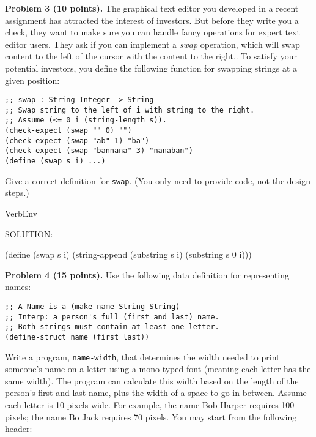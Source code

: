\documentclass[12pt]{article}
\begin{document}

\newpage

\noindent
{\bf Problem 3 (10 points).}
%
The graphical text editor you developed in a recent assignment has
attracted the interest of investors.  But before they write you a
check, they want to make sure you can handle fancy operations for
expert text editor users.  They ask if you can implement a \emph{swap}
operation, which will swap content to the left of the cursor with the
content to the right..  To satisfy your potential investors, you
define the following function for swapping strings at a given
position:
\begin{verbatim}
;; swap : String Integer -> String
;; Swap string to the left of i with string to the right.
;; Assume (<= 0 i (string-length s)).
(check-expect (swap "" 0) "")
(check-expect (swap "ab" 1) "ba")
(check-expect (swap "bannana" 3) "nanaban")
(define (swap s i) ...)
\end{verbatim}

\noindent
Give a correct definition for \verb|swap|.  (You only need to
provide code, not the design steps.)

\begin{SaveVerbatim}{VerbEnv}

SOLUTION:

(define (swap s i)
  (string-append (substring s i)
                 (substring s 0 i)))
\end{SaveVerbatim}




\newpage 
\noindent
{\bf Problem 4 (15 points).}
%
Use the following data definition for representing names:
\begin{verbatim}
;; A Name is a (make-name String String)
;; Interp: a person's full (first and last) name.
;; Both strings must contain at least one letter.
(define-struct name (first last))
\end{verbatim}

\noindent
Write a program, \verb|name-width|, that determines the width needed
to print someone's name on a letter using a mono-typed font (meaning
each letter has the same width).  The program can calculate this width
based on the length of the person's first and last name, plus the
width of a space to go in between.  Assume each letter is 10 pixels
wide.  For example, the name Bob Harper requires 100 pixels; the name
Bo Jack requires 70 pixels.  You may start from the following header:
\end{document}
